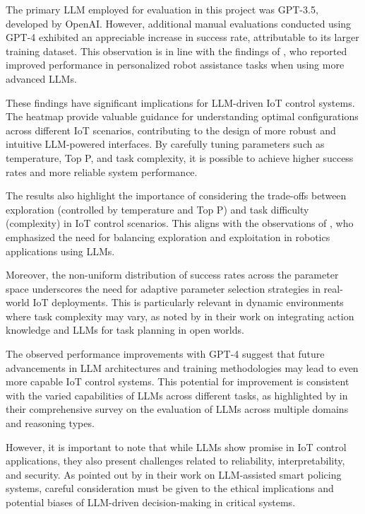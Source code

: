 \documentclass{ieeeaccess}
\begin{document}
The primary LLM employed for evaluation in this project was GPT-3.5, developed by OpenAI. However, additional manual evaluations conducted using GPT-4 exhibited an appreciable increase in success rate, attributable to its larger training dataset. This observation is in line with the findings of \citet{Wu2023}, who reported improved performance in personalized robot assistance tasks when using more advanced LLMs.

These findings have significant implications for LLM-driven IoT control systems. The heatmap provide valuable guidance for understanding optimal configurations across different IoT scenarios, contributing to the design of more robust and intuitive LLM-powered interfaces. By carefully tuning parameters such as temperature, Top P, and task complexity, it is possible to achieve higher success rates and more reliable system performance.

The results also highlight the importance of considering the trade-offs between exploration (controlled by temperature and Top P) and task difficulty (complexity) in IoT control scenarios. This aligns with the observations of \citet{10500490}, who emphasized the need for balancing exploration and exploitation in robotics applications using LLMs.

Moreover, the non-uniform distribution of success rates across the parameter space underscores the need for adaptive parameter selection strategies in real-world IoT deployments. This is particularly relevant in dynamic environments where task complexity may vary, as noted by \citet{Singh2023} in their work on integrating action knowledge and LLMs for task planning in open worlds.

The observed performance improvements with GPT-4 suggest that future advancements in LLM architectures and training methodologies may lead to even more capable IoT control systems. This potential for improvement is consistent with the varied capabilities of LLMs across different tasks, as highlighted by \citet{Kumar2024} in their comprehensive survey on the evaluation of LLMs across multiple domains and reasoning types.

However, it is important to note that while LLMs show promise in IoT control applications, they also present challenges related to reliability, interpretability, and security. As pointed out by \citet{10538107} in their work on LLM-assisted smart policing systems, careful consideration must be given to the ethical implications and potential biases of LLM-driven decision-making in critical systems.
\end{document}
